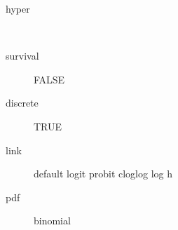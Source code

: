 \begin{description}
	\item[hyper]\ 
	 \item[ survival ] FALSE 
	 \item[ discrete ] TRUE 
	 \item[ link ] default logit probit cloglog log h 
	 \item[ pdf ] binomial 
\end{description}
